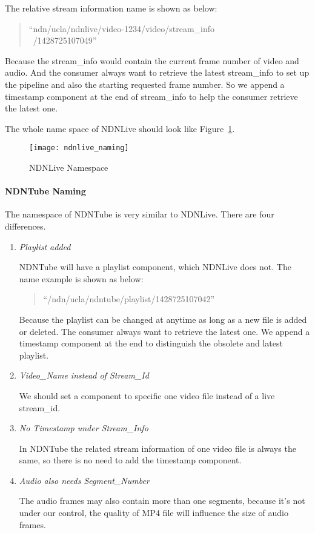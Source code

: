 The relative stream information name is shown as below:
\begin{quote}
``ndn/ucla/ndnlive/video-1234/video/stream\_info \\\ /1428725107049''
\end{quote}

Because the stream\_info would contain the current frame number of video and audio. And the consumer always want to retrieve the latest stream\_info to set up the pipeline and also the starting requested frame number. So we append a timestamp component at the end of stream\_info to help the consumer retrieve the latest one.

The whole name space of NDNLive should look like Figure~\ref{fig:ndnlive_naming}.

\begin{figure}%
  \centering
  \texttt{[image: ndnlive\_naming]}
  \caption{NDNLive Namespace}
  \label{fig:ndnlive_naming}
\end{figure}
\paragraph{NDNTube Naming} %
\label{par:ndntube_naming}

The namespace of NDNTube is very similar to NDNLive. There are four differences.
\begin{enumerate}
	\item{\textit{Playlist added}} 
		
		NDNTube will have a playlist component, which NDNLive does not. The name example is shown as below: 
		\begin{quote}
		``/ndn/ucla/ndntube/playlist/1428725107042''
		\end{quote}
		Because the playlist can be changed at anytime as long as a new file is added or deleted. The consumer always want to retrieve the latest one. We append a timestamp component at the end to distinguish the obsolete and latest playlist.

	\item{\textit{Video\_Name instead of Stream\_Id}} 

		We should set a component to specific one video file instead of a live stream\_id.

	\item{\textit{No Timestamp under Stream\_Info}} 

		In NDNTube the related stream information of one video file is always the same, so there is no need to add the timestamp component.

	\item{\textit{Audio also needs Segment\_Number}} 

		The audio frames may also contain more than one segments, because it's not under our control, the quality of MP4 file will influence the size of audio frames.
\end{enumerate}

